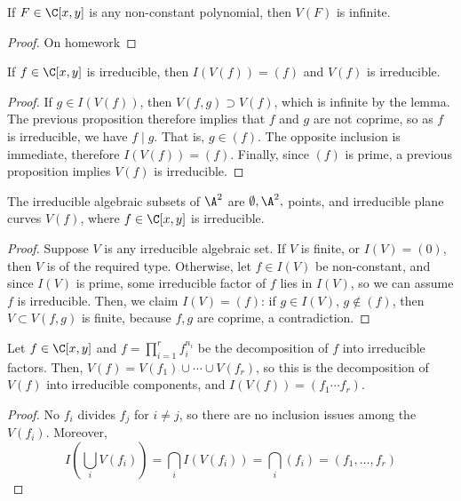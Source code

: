 \begin{lem}
    If $F \in \C[x,y]$ is any non-constant polynomial, then $V(F)$ is infinite.
\end{lem}

\begin{proof}
    On homework
\end{proof}

\begin{cor}
    If $f \in \C[x,y]$ is irreducible, then $I(V(f))=(f)$ and $V(f)$ is irreducible.
\end{cor}

\begin{proof}
    If $g \in I(V(f))$, then $V(f,g) \supset V(f)$, which is infinite by the lemma. The previous proposition therefore implies that $f$ and $g$ are not coprime, so as $f$ is irreducible, we have $f \mid g$. That is, $g \in (f)$. The opposite inclusion is immediate, therefore $I(V(f))=(f)$. Finally, since $(f)$ is prime, a previous proposition implies $V(f)$ is irreducible.
\end{proof}

\begin{cor}
    The irreducible algebraic subsets of $\A^2$ are $\emptyset,\A^2,$ points, and irreducible plane curves $V(f)$, where $f \in \C[x,y]$ is irreducible.
\end{cor}

\begin{proof}
    Suppose $V$ is any irreducible algebraic set. If $V$ is finite, or $I(V)=(0)$, then $V$ is of the required type. Otherwise, let $f \in I(V)$ be non-constant, and since $I(V)$ is prime, some irreducible factor of $f$ lies in $I(V)$, so we can assume $f$ is irreducible. Then, we claim $I(V)=(f)$: if $g \in I(V)$, $g \not \in (f)$, then $V \subset V(f,g)$ is finite, because $f,g$ are coprime, a contradiction.
\end{proof}

\begin{cor}
    Let $f \in \C[x,y]$ and $f = \prod _{i=1}^rf_i^{n_i}$ be the decomposition of $f$ into irreducible factors. Then, $V(f) = V(f_1) \cup \cdots \cup V(f_r)$, so this is the decomposition of $V(f)$ into irreducible components, and $I(V(f))=(f_1\cdots f_r)$.
\end{cor}

\begin{proof}
    No $f_i$ divides $f_j$ for $i \neq j$, so there are no inclusion issues among the $V(f_i)$. Moreover,
    $$I(\bigcup _{i}V(f_i))=\bigcap _iI(V(f_i))=\bigcap_i (f_i)=(f_1,\dots,f_r)$$
\end{proof}
